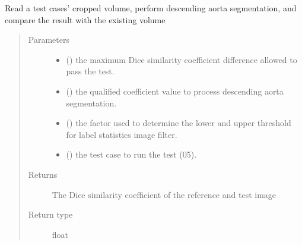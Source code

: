 \documentclass[letterpaper,10pt,english]{sphinxmanual}
\begin{document}

\begin{fulllineitems}
\label{\detokenize{test:test_image_preprocessing.test_compare_des}}
\sphinxAtStartPar
Read a test cases’ cropped volume,
perform descending aorta segmentation,
and compare the result with the existing volume
\begin{quote}\begin{description}
\item[{Parameters}] \leavevmode\begin{itemize}
\item {} 
\sphinxAtStartPar
{} () \textendash{} the maximum Dice similarity coefficient difference allowed to pass the test.

\item {} 
\sphinxAtStartPar
{} () \textendash{} the qualified coefficient value to process descending aorta segmentation.

\item {} 
\sphinxAtStartPar
{} () \textendash{} the factor used to determine the lower and upper threshold for label statistics image filter.

\item {} 
\sphinxAtStartPar
{} () \textendash{} the test case to run the test (0\sphinxhyphen{}5).

\end{itemize}

\item[{Returns}] \leavevmode
\sphinxAtStartPar
The Dice similarity coefficient of the reference and test image

\item[{Return type}] \leavevmode
\sphinxAtStartPar
float

\end{description}\end{quote}

\end{fulllineitems}
\end{document}
